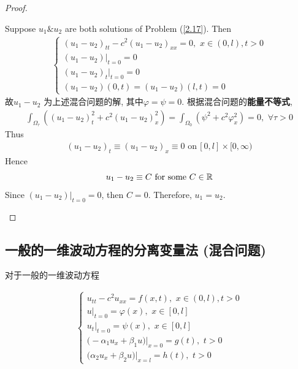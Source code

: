 \begin{thm}
\begin{proof}
\begin{itemize}
				\newpage
				
				Suppose $u_1 \& u_2$ are both solutions of Problem (\ref{2.17}). Then 
				\begin{align*}
					\begin{cases}
						(u_1 - u_2)_{tt} - c^2 (u_1 - u_2)_{xx} = 0 , \,\, x \in (0 , l) , t > 0 \\
						(u_1 - u_2) \Big|_{t = 0} = 0 \\
						(u_1 - u_2)_t \Big|_{t = 0} = 0 \\
						(u_1 - u_2)(0 , t) = (u_1 - u_2)(l , t) = 0
					\end{cases}
				\end{align*}
				故$u_1 - u_2$ 为上述混合问题的解, 其中$\varphi = \psi = 0$. 根据混合问题的\textbf{能量不等式}, 
				\begin{align*}
					\int_{\Omega_\tau} ((u_1 - u_2)_{t}^2 + c^2 (u_1 - u_2)_{x}^2) = \int_{\Omega_0} (\psi^2 + c^2 \varphi_{x}^2) = 0 , \,\, \forall \tau > 0
				\end{align*}
				Thus
				\begin{align*}
					(u_1 - u_2)_t \equiv (u_1 - u_2)_x \equiv 0 \,\, \text{on} \, [0 , l] \times [0 , \infty)
				\end{align*}
				Hence
				\[ u_1 - u_2 \equiv C \,\, \text{for some} \,\, C \in \mathbb{R} \]
				Since $(u_1 - u_2) \Big|_{t = 0} = 0$, then $C = 0$. Therefore, $u_1 = u_2$. 
			\end{itemize}
		\end{proof}
	\end{thm}

\newpage

\subsection{一般的一维波动方程的分离变量法 (混合问题)}
	对于一般的一维波动方程
	
	\begin{align}
		\begin{cases}
			u_{tt} - c^2 u_{xx} = f(x , t) , \,\, x \in (0 , l) , t > 0 \\
			u \Big|_{t = 0} = \varphi(x) , \,\, x \in [0 , l]\\
			u_t \Big|_{t = 0} = \psi(x) , \,\, x \in [0 , l] \\
			\Big( -\alpha_1 u_x + \beta_1 u \Big) \Big|_{x = 0} = g(t) , \,\, t > 0 \\
			\Big( \alpha_2 u_x + \beta_2 u \Big) \Big|_{x = l} = h(t) , \,\, t > 0
		\end{cases}\label{2.21}
	\end{align}

